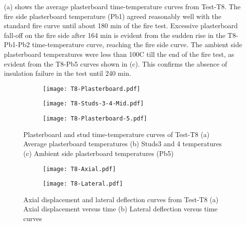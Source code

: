  (a) shows the average plasterboard time-temperature curves from Test-T8. The fire side plasterboard temperature (Pb1) agreed reasonably well with the standard fire curve until about 180 min of the fire test. Excessive plasterboard fall-off on the fire side after 164 min is evident from the sudden rise in the T8-Pb1-Pb2 time-temperature curve, reaching the fire side curve. The ambient side plasterboard temperatures were less than 100\degree C till the end of the fire test, as evident from the T8-Pb5 curves shown in  (c). This confirms the absence of insulation failure in the test until 240 min.
\begin{figure}[!htbp]
	\centering
	\begin{subfigure}[b]{0.45\textwidth}
		\centering
		\texttt{[image: T8-Plasterboard.pdf]}
		\caption{}
		\label{subfig:T8-Plasterboard}
	\end{subfigure}
	\begin{subfigure}[b]{0.48\textwidth}
		\centering
		\texttt{[image: T8-Studs-3-4-Mid.pdf]}
		\caption{}
		\label{subfig:T8-Studs-3-4-Mid}
	\end{subfigure}
	\begin{subfigure}[b]{0.5\textwidth}
		\centering
		\texttt{[image: T8-Plasterboard-5.pdf]}
		\caption{}
		\label{subfig:T8-Plasterboard-5}
	\end{subfigure}
	\caption{Plasterboard and stud time-temperature curves of Test-T8 (a) Average plasterboard temperatures (b) Studs3 and 4 temperatures (c) Ambient side plasterboard temperatures (Pb5) }
	\label{fig:T8-time-temperature}
\end{figure}
\begin{figure}[!htbp]
	\centering
	\begin{subfigure}[b]{0.48\textwidth}
		\centering
		\texttt{[image: T8-Axial.pdf]}
		\caption{}
		\label{subfig:T8-Axial}
	\end{subfigure}
	\begin{subfigure}[b]{0.43\textwidth}
		\centering
		\texttt{[image: T8-Lateral.pdf]}
		\caption{}
		\label{subfig:T8-Lateral}
	\end{subfigure}
	\caption{Axial displacement and lateral deflection curves from Test-T8 (a) Axial displacement versus time (b) Lateral deflection versus time curves}
	\label{fig:T8-displacement}
\end{figure}

